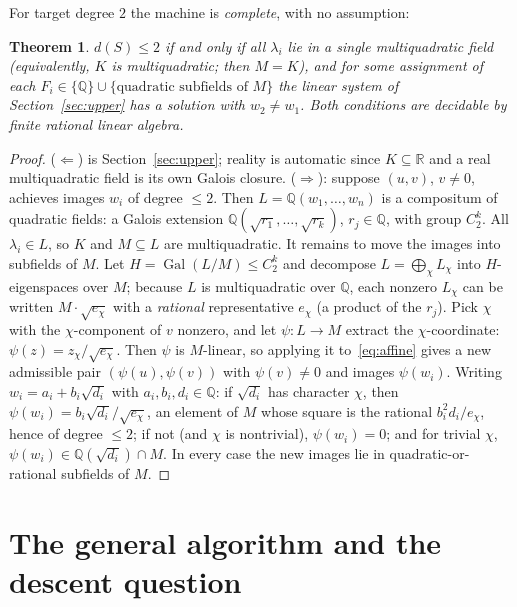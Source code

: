 \documentclass[11pt]{article}
\newtheorem{theorem}{Theorem}
\theoremstyle{definition}
\theoremstyle{remark}
\newcommand{\Q}{\mathbb{Q}}
\newcommand{\R}{\mathbb{R}}
\newcommand{\Gal}{\operatorname{Gal}}
\begin{document}
For target degree $2$ the machine is \emph{complete}, with no assumption:

\begin{theorem}\label{thm:d2}
$d(S) \le 2$ if and only if all $\lambda_i$ lie in a single multiquadratic field (equivalently,
$K$ is multiquadratic; then $M = K$), and for some assignment of each $F_i \in \{\Q\} \cup
\{\text{quadratic subfields of } M\}$ the linear system of Section~\ref{sec:upper} has a
solution with $w_2 \neq w_1$. Both conditions are decidable by finite rational linear algebra.
\end{theorem}

\begin{proof}
($\Leftarrow$) is Section~\ref{sec:upper}; reality is automatic since $K \subseteq \R$ and a
real multiquadratic field is its own Galois closure. ($\Rightarrow$): suppose $(u, v)$,
$v \neq 0$, achieves images $w_i$ of degree $\le 2$. Then $L = \Q(w_1, \dots, w_n)$ is a
compositum of quadratic fields: a Galois extension $\Q(\sqrt{r_1}, \dots, \sqrt{r_k})$,
$r_j \in \Q$, with group $C_2^k$. All $\lambda_i \in L$, so $K$ and $M \subseteq L$ are
multiquadratic. It remains to move the images into subfields of $M$. Let
$H = \Gal(L/M) \le C_2^k$ and decompose $L = \bigoplus_\chi L_\chi$ into $H$-eigenspaces over
$M$; because $L$ is multiquadratic over $\Q$, each nonzero $L_\chi$ can be written
$M \cdot \sqrt{e_\chi}$ with a \emph{rational} representative $e_\chi$ (a product of the
$r_j$). Pick $\chi$ with the $\chi$-component of $v$ nonzero, and let $\psi : L \to M$ extract
the $\chi$-coordinate: $\psi(z) = z_\chi / \sqrt{e_\chi}$. Then $\psi$ is $M$-linear, so
applying it to~\eqref{eq:affine} gives a new admissible pair
$(\psi(u), \psi(v))$ with $\psi(v) \neq 0$ and images $\psi(w_i)$. Writing
$w_i = a_i + b_i \sqrt{d_i}$ with $a_i, b_i, d_i \in \Q$: if $\sqrt{d_i}$ has character
$\chi$, then $\psi(w_i) = b_i \sqrt{d_i}/\sqrt{e_\chi}$, an element of $M$ whose square is the
rational $b_i^2 d_i / e_\chi$, hence of degree $\le 2$; if not (and $\chi$ is nontrivial),
$\psi(w_i) = 0$; and for trivial $\chi$, $\psi(w_i) \in \Q(\sqrt{d_i}) \cap M$. In every case
the new images lie in quadratic-or-rational subfields of $M$.
\end{proof}

\section{The general algorithm and the descent question}\label{sec:descent}
\end{document}
